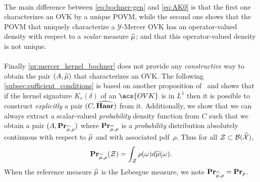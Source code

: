 \paragraph{}
The main difference between \cref{eq:bochner-gen} and
\cref{eq:AK0} is that the first one characterizes an \acs{OVK}
by a unique \acf{POVM}, while the second one shows that the \acs{POVM} that
uniquely characterize a $\mathcal{Y}$-Mercer \acs{OVK} has an operator-valued
density with respect to a \emph{scalar} measure $\widehat{\mu}$; and that this
operator-valued density is not unique.
\paragraph{}
Finally \cref{pr:mercer_kernel_bochner} does not provide any
\emph{constructive} way to obtain the pair $(A,\widehat{\mu})$ that characterizes
an \acs{OVK}. The following \cref{subsec:sufficient_conditions} is based on
another proposition of~\citeauthor{carmeli2006vector} and shows that if the
kernel signature $K_e(\delta)$ of an $\acs{OVK}$ is in $L^1$ then it is
possible to construct \emph{explicitly} a pair $(C,\widehat{\mathbf{Haar}})$ from it.
Additionally, we show that we can always extract a scalar-valued
\emph{probability} density function from $C$ such that we obtain a pair
$(A,{\mathbf{{Pr}}}_{\widehat{\mu},\rho})$ where ${\mathbf{{Pr}}}_{\widehat{\mu},\rho}$ is
a \emph{probability} distribution absolutely continuous with respect to
$\widehat{\mu}$ and with associated \ac{pdf}~$\rho$. Thus for all
$\mathcal{Z}\subset\mathcal{B}(\widehat{\mathcal{X}})$,
\begin{dmath*}
    \probability_{\dual{\mu},\rho}(\mathcal{Z})=\int_{\mathcal{Z}}
    \rho(\omega)d\dual{\mu}(\omega).
\end{dmath*}
When the reference measure $\widehat{\mu}$ is the Lebesgue measure, we note
${\mathbf{{Pr}}}_{\widehat{\mu},\rho}={\mathbf{{Pr}}}_{\rho}$.

